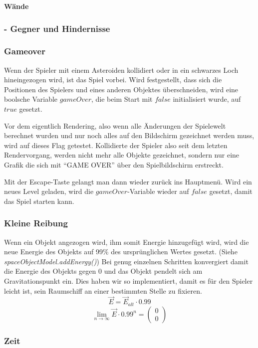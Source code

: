 \documentclass[12pt,a4paper]{scrartcl}
\newcommand{\q}[1]{``#1''}
\begin{document}
\textbf{Wände}

\subsubsection{- Gegner und Hindernisse}

\subsubsection{Gameover}
Wenn der Spieler mit einem Asteroiden kollidiert oder in ein schwarzes Loch
hineingezogen wird, ist das Spiel vorbei. Wird festgestellt, dass sich die 
Positionen des Spielers und eines anderen Objektes überschneiden, wird eine boolsche
Variable $gameOver$, die beim Start mit $false$ initialisiert wurde, auf $true$ gesetzt.

Vor dem eigentlich Rendering, also wenn alle Änderungen der Spielewelt berechnet wurden
und nur noch alles auf den Bildschirm gezeichnet werden muss, wird auf dieses Flag getestet.
Kollidierte der Spieler also seit dem letzten Rendervorgang, werden nicht mehr alle Objekte
gezeichnet, sondern nur eine Grafik die sich mit \q{GAME OVER} über den Spielbildschirm erstreckt.

Mit der Escape-Taste gelangt man dann wieder zurück ins Hauptmenü. Wird ein neues Level geladen,
wird die $gameOver$-Variable wieder auf $false$ gesetzt, damit das Spiel starten kann.


\subsubsection{Kleine Reibung}
Wenn ein Objekt angezogen wird, ihm somit Energie hinzugefügt wird, wird die neue Energie des Objekts auf 99\%
des ursprünglichen Wertes gesetzt. (Siehe \textit{spaceObjectModel.addEnergy()}) Bei genug einzelnen Schritten konvergiert damit die Energie des Objekts gegen 0 und
das Objekt pendelt sich am Gravitationspunkt ein. Dies haben wir so implementiert, damit es für den Spieler leicht ist,
sein Raumschiff an einer bestimmten Stelle zu fixieren.
\[ \vec{E} = \vec{E}_{alt} \cdot 0.99 \]
\[ \lim_{n\rightarrow \infty} \vec{E} \cdot 0.99^n = \begin{pmatrix}0\\0\end{pmatrix} \] 

\subsubsection{Zeit}
\end{document}
